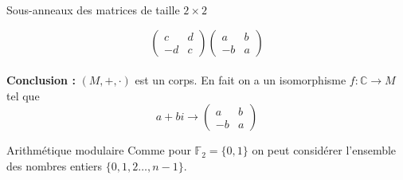 \begin{parag}{Sous-anneaux des matrices de taille $2 \times 2$}
\begin{enumerate}
\[\begin{pmatrix}
            c & d \\ -d & c
        \end{pmatrix}\begin{pmatrix}
            a & b \\ -b & a
        \end{pmatrix}\]
        \\
        \textbf{Conclusion : } $(M, +, \cdot)$ est un corps. En fait on a un isomorphisme $f : \mathbb{C} \to M$ tel que 
        \[a + bi \to \begin{pmatrix}
            a & b \\ -b & a
        \end{pmatrix}\]
    \end{enumerate}
\end{parag}
\begin{parag}{Arithmétique modulaire}
    Comme pour $\mathbb{F}_2 = \{0,1\}$ on peut considérer l'ensemble des nombres entiers $\{0, 1, 2 \dots, n-1\}$.
\end{parag}